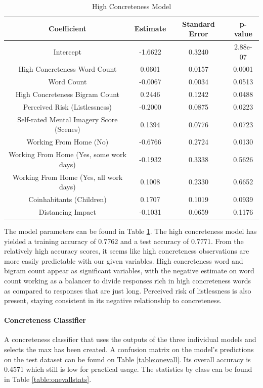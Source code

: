 \documentclass[12pt, a4paper]{article}
\begin{document}
\begin{table}[ht]
\centering
\begin{tabular}{||c c c c||} 
 \hline
 Coefficient & Estimate & Standard Error & p-value \\ [0.5ex] 
 \hline\hline
 Intercept & -1.6622 & 0.3240 & 2.88e-07 \\ 
 High Concreteness Word Count & 0.0601 & 0.0157 & 0.0001 \\
 Word Count & -0.0067 & 0.0034 & 0.0513 \\
 High Concreteness Bigram Count & 0.2446 & 0.1242 & 0.0488 \\
 Perceived Risk (Listlessness)  & -0.2000 & 0.0875 & 0.0223 \\ 
 Self-rated Mental Imagery Score (Scenes)  & 0.1394 & 0.0776 & 0.0723 \\ 
 Working From Home (No)  & -0.6766 & 0.2724 & 0.0130 \\ 
 Working From Home (Yes, some work days)  & -0.1932 & 0.3338 & 0.5626 \\ 
 Working From Home (Yes, all work days)  & 0.1008 & 0.2330 & 0.6652 \\ 
 Coinhabitants (Children)  & 0.1707 & 0.1019 & 0.0939 \\ 
 Distancing Impact  & -0.1031 & 0.0659 & 0.1176 \\ [1ex] 
 \hline
\end{tabular}
\caption{High Concreteness Model}
\label{table:high}
\end{table}

The model parameters can be found in Table \ref{table:high}. The high concreteness model has yielded a training accuracy of 0.7762 and a test accuracy of 0.7771. From the relatively high accuracy scores, it seems like high concreteness observations are more easily predictable with our given variables. High concreteness word and bigram count appear as significant variables, with the negative estimate on word count working as a balancer to divide responses rich in high concreteness words as compared to responses that are just long. Perceived risk of listlessness is also present, staying consistent in its negative relationship to concreteness.

\paragraph{Concreteness Classifier}

A concreteness classifier that uses the outputs of the three individual models and selects the max has been created. A confusion matrix on the model's predictions on the test dataset can be found on Table \ref{table:onevall}. Its overall accuracy is 0.4571 which still is low for practical usage. The statistics by class can be found in Table \ref{table:onevallstats}.
\end{document}
